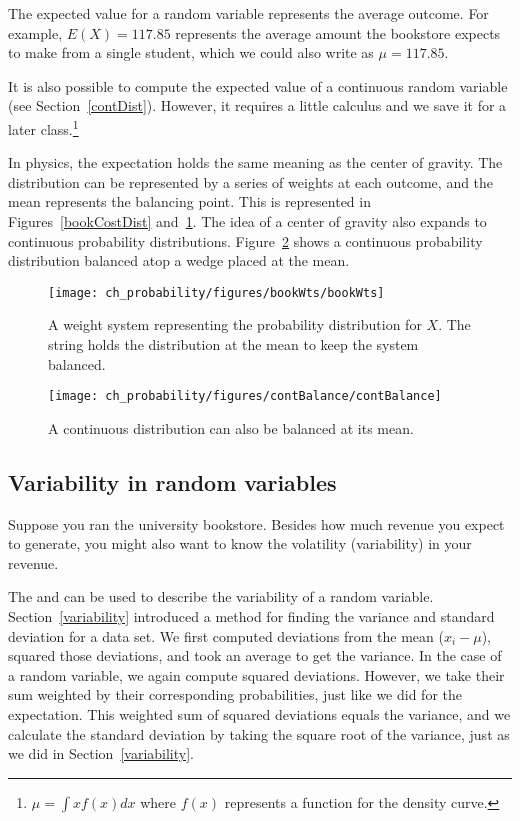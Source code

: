 The expected value for a random variable represents the average outcome. For example, $E(X)=117.85$ represents the average amount the bookstore expects to make from a single student, which we could also write as $\mu=117.85$.

It is also possible to compute the expected value of a continuous random variable (see Section~\ref{contDist}). However, it requires a little calculus and we save it for a later class.\footnote{$\mu = \int xf(x)dx$ where $f(x)$ represents a function for the density curve.}

In physics, the expectation holds the same meaning as the center of gravity. The distribution can be represented by a series of weights at each outcome, and the mean represents the balancing point. This is represented in Figures~\ref{bookCostDist} and~\ref{bookWts}. The idea of a center of gravity also expands to continuous probability distributions. Figure~\ref{contBalance} shows a continuous probability distribution balanced atop a wedge placed at the mean.

\begin{figure}
\centering
\texttt{[image: ch\_probability/figures/bookWts/bookWts]}
\caption{A weight system representing the probability distribution for $X$. The string holds the distribution at the mean to keep the system balanced.}
\label{bookWts}
\end{figure}

\begin{figure}
\centering
\texttt{[image: ch\_probability/figures/contBalance/contBalance]}
\caption{A continuous distribution can also be balanced at its mean.}
\label{contBalance}
\end{figure}



\subsection{Variability in random variables}

Suppose you ran the university bookstore. Besides how much revenue you expect to generate, you might also want to know the volatility (variability) in your revenue. 

The  and  can be used to describe the variability of a random variable. Section~\ref{variability}
introduced a method for finding the variance and standard deviation for a data set. We first computed deviations from the mean ($x_i - \mu$), squared those deviations, and took an average to get the variance. In the case of a random variable, we again compute squared deviations. However, we take their sum weighted by their corresponding probabilities, just like we did for the expectation. This weighted sum of squared deviations equals the variance, and we calculate the standard deviation by taking the square root of the variance, just as we did in Section~\ref{variability}.

